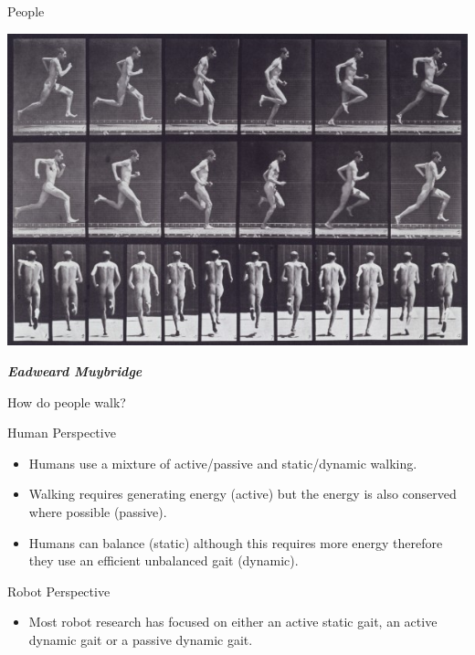 \documentclass[compress]{beamer}
\begin{document}
\begin{frame}{People}

    \begin{center}
        \includegraphics[width=0.8\linewidth]{image15}

    \emph{\textbf{Eadweard Muybridge}}
    \end{center}

\end{frame}

\begin{frame}{How do people walk?}

    Human Perspective

    \begin{itemize}

        \item Humans use a mixture of active/passive and static/dynamic walking.
        \item Walking requires generating energy (active) but the energy is also
            conserved where possible (passive).
        \item Humans can balance (static) although this requires more energy
            therefore they use an efficient unbalanced gait (dynamic).
    \end{itemize}

    Robot Perspective

    \begin{itemize}

        \item Most robot research has focused on either an active static gait, an
            active dynamic gait or a passive dynamic gait.
    \end{itemize}

\end{frame}
\end{document}
